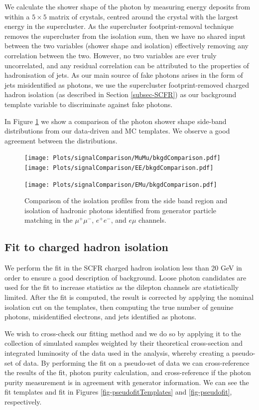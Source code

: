 We calculate the shower shape of the photon by measuring energy deposits from within a $5 \times 5$ matrix of crystals, centred around the crystal with the largest energy in the supercluster. As the supercluster footprint-removal technique removes the supercluster from the isolation sum, then we have no shared input between the two variables (shower shape and isolation) effectively removing any correlation between the two. However, no two variables are ever truly uncorrelated, and any residual correlation can be attributed to the properties of hadronisation of jets. As our main source of fake photons arises in the form of jets misidentified as photons, we use the supercluster footprint-removed charged hadron isolation (as described in Section \ref{subsec-SCFR}) as our background template variable to discriminate against fake photons.

In Figure \ref{fig-backgroundComparison} we show a comparison of the photon shower shape side-band distributions from our data-driven and MC templates. We observe a good agreement between the distributions.  


\begin{figure}
\texttt{[image: Plots/signalComparison/MuMu/bkgdComparison.pdf]}
\texttt{[image: Plots/signalComparison/EE/bkgdComparison.pdf]}
\begin{center}
\texttt{[image: Plots/signalComparison/EMu/bkgdComparison.pdf]}
\end{center}
\caption{Comparison of the isolation profiles from the side band region and isolation of hadronic photons identified from generator particle matching in the $\mu^{+}\mu^{-}$, $e^{+}e^{-}$, and $e\mu$ channels.}
\label{fig-backgroundComparison}
\end{figure}

\subsection{Fit to charged hadron isolation}

We perform the fit in the SCFR charged hadron isolation less than 20 GeV in order to ensure a good description of background. Loose photon candidates are used for the fit to increase statistics as the dilepton channels are statistically limited. After the fit is computed, the result is corrected by applying the nominal isolation cut on the templates, then computing the true number of genuine photons, misidentified electrons, and jets identified as photons. 

We wish to cross-check our fitting method and we do so by applying it to the collection of simulated samples weighted by their theoretical cross-section and integrated luminosity of the data used in the analysis, whereby creating a pseudo-set of data. By performing the fit on a pseudo-set of data we can cross-reference the results of the fit, photon purity calculation, and cross-reference if the photon purity measurement is in agreement with generator information. We can see the fit templates and fit in Figures \ref{fig-pseudofitTemplates} and \ref{fig-pseudofit}, respectively.


